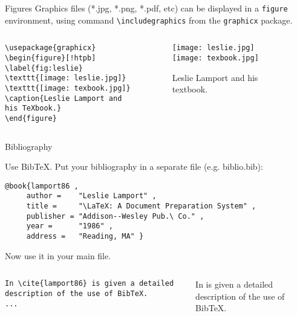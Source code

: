 \begin{frame}[fragile]{Figures}
Graphics files (*.jpg, *.png, *.pdf, etc) can be displayed in a \texttt{figure} environment, using command \verb!\includegraphics! from the \texttt{graphicx} package.
\begin{columns}
\begin{column}{5cm}
\begin{lstlisting}
\usepackage{graphicx}
\begin{figure}[!htpb]
\label{fig:leslie}
\texttt{[image: leslie.jpg]}
\texttt{[image: texbook.jpg]}
\caption{Leslie Lamport and his TeXbook.}
\end{figure}
\end{lstlisting}
\end{column}
\begin{column}{5cm}
\begin{figure}[!htpb]
\label{fig:leslie}
\texttt{[image: leslie.jpg]}
\texttt{[image: texbook.jpg]}
\caption{Leslie Lamport and his textbook.}
\end{figure}
\end{column}
\end{columns}
\end{frame}

\begin{frame}[fragile]{Bibliography}

Use BibTeX. Put your bibliography in a separate file (e.g. biblio.bib): 
\begin{lstlisting}
@book{lamport86 ,
     author =    "Leslie Lamport" ,
     title =     "\LaTeX: A Document Preparation System" ,
     publisher = "Addison--Wesley Pub.\ Co." ,
     year =      "1986" ,
     address =   "Reading, MA" }
\end{lstlisting}
Now use it in your main file.
\begin{columns}
\begin{column}{5cm}
\begin{lstlisting}
In \cite{lamport86} is given a detailed description of the use of BibTeX.
...


\end{lstlisting}
\end{column}
\begin{column}{5cm}
In \cite{lamport86} is given a detailed description of the use of BibTeX.
\end{column}
\end{columns}


\end{frame}

